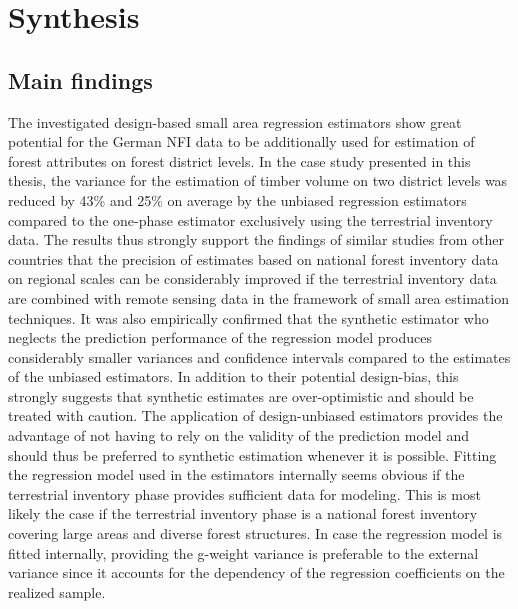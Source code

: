 	
\chapter{Synthesis}
\label{chap:synth}
\newpage



\section{Main findings}
\label{sec:synth:mainfind}

The investigated design-based small area regression estimators show great potential for the German NFI data to be additionally used for estimation of forest attributes on forest district levels. In the case study presented in this thesis, the variance for the estimation of timber volume on two district levels was reduced by 43\% and 25\% on average by the unbiased regression estimators compared to the one-phase estimator exclusively using the terrestrial inventory data. The results thus strongly support the findings of similar studies from other countries that the precision of estimates based on national forest inventory data on regional scales can be considerably improved if the terrestrial inventory data are combined with remote sensing data in the framework of small area estimation techniques. It was also empirically confirmed that the synthetic estimator who neglects the prediction performance of the regression model produces considerably smaller variances and confidence intervals compared to the estimates of the unbiased estimators. In addition to their potential design-bias, this strongly suggests that synthetic estimates are over-optimistic and should be treated with caution. The application of design-unbiased estimators provides the advantage of not having to rely on the validity of the prediction model and should thus be preferred to synthetic estimation whenever it is possible. Fitting the regression model used in the estimators internally seems obvious if the terrestrial inventory phase provides sufficient data for modeling. This is most likely the case if the terrestrial inventory phase is a national forest inventory covering large areas and diverse forest structures. In case the regression model is fitted internally, providing the g-weight variance is preferable to the external variance since it accounts for the dependency of the regression coefficients on the realized sample.\par

